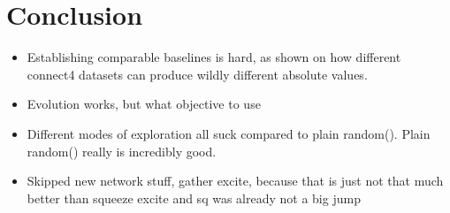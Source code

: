 \documentclass[12pt,onecolumn,oneside,titlepage]{article}
\begin{document}
\section{Conclusion}

\begin{itemize}
 \item Establishing comparable baselines is hard, as shown on how different connect4 datasets can produce wildly different absolute values.
 \item Evolution works, but what objective to use
 \item Different modes of exploration all suck compared to plain random(). Plain random() really is incredibly good.
 \item Skipped new network stuff, gather excite, because that is just not that much better than squeeze excite and sq was already not a big jump
\end{itemize}



\pagebreak




\end{document}
